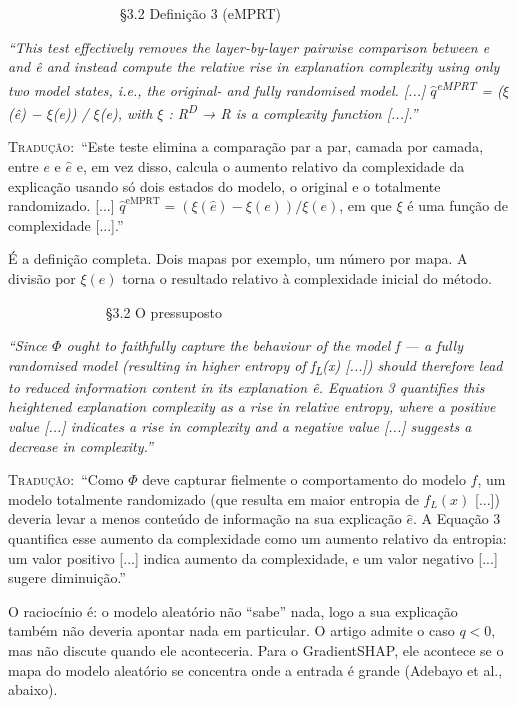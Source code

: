 \documentclass[11pt,a4paper]{article}
\newcommand{\pagechip}[1]{{\setlength{\fboxsep}{1.5pt}\colorbox{cAcc}{\textcolor{white}{\scriptsize\texttt{#1}}}}}
\newenvironment{origquote}{\par\itshape\small}{\par}
\newenvironment{tradquote}{\par\small\textsc{Tradução:}\ }{\par}
\newcommand{\explab}[1]{\par\smallskip{\small\color{cAcc}\textbf{\MakeUppercase{#1}}}\par}
\begin{document}
\begin{citacard}{\pagechip{Hedström p. 4--5} §3.2 Definição 3 (eMPRT)}
\begin{origquote}“This test effectively removes the layer-by-layer pairwise comparison between e and ê and instead compute the relative rise in explanation complexity using only two model states, i.e., the original- and fully randomised model. [...] $\hat{q}$\textsuperscript{eMPRT} = ($\xi$(ê) − $\xi$(e)) / $\xi$(e), with $\xi$ : R\textsuperscript{D} → R is a complexity function [...].”\end{origquote}
\begin{tradquote}“Este teste elimina a comparação par a par, camada por camada, entre $e$ e $\hat{e}$ e, em vez disso, calcula o aumento relativo da complexidade da explicação usando só dois estados do modelo, o original e o totalmente randomizado. [...] $\hat{q}^{\text{eMPRT}} = (\xi(\hat{e}) - \xi(e))/\xi(e)$, em que $\xi$ é uma função de complexidade [...].”\end{tradquote}
\explab{Explicação}
É a definição completa. Dois mapas por exemplo, um número por mapa. A divisão por $\xi(e)$ torna o resultado relativo à complexidade inicial do método.
\end{citacard}

\begin{citacard}{\pagechip{Hedström p. 5} §3.2 O pressuposto}
\begin{origquote}“Since $\Phi$ ought to faithfully capture the behaviour of the model f --- a fully randomised model (resulting in higher entropy of f\textsubscript{L}(x) [...]) should therefore lead to reduced information content in its explanation ê. Equation 3 quantifies this heightened explanation complexity as a rise in relative entropy, where a positive value [...] indicates a rise in complexity and a negative value [...] suggests a decrease in complexity.”\end{origquote}
\begin{tradquote}“Como $\Phi$ deve capturar fielmente o comportamento do modelo $f$, um modelo totalmente randomizado (que resulta em maior entropia de $f_L(x)$ [...]) deveria levar a menos conteúdo de informação na sua explicação $\hat{e}$. A Equação 3 quantifica esse aumento da complexidade como um aumento relativo da entropia: um valor positivo [...] indica aumento da complexidade, e um valor negativo [...] sugere diminuição.”\end{tradquote}
\explab{Explicação}
O raciocínio é: o modelo aleatório não “sabe” nada, logo a sua explicação também não deveria apontar nada em particular. O artigo admite o caso $q < 0$, mas não discute quando ele aconteceria. Para o GradientSHAP, ele acontece se o mapa do modelo aleatório se concentra onde a entrada é grande (Adebayo et al., abaixo).
\end{citacard}
\end{document}
